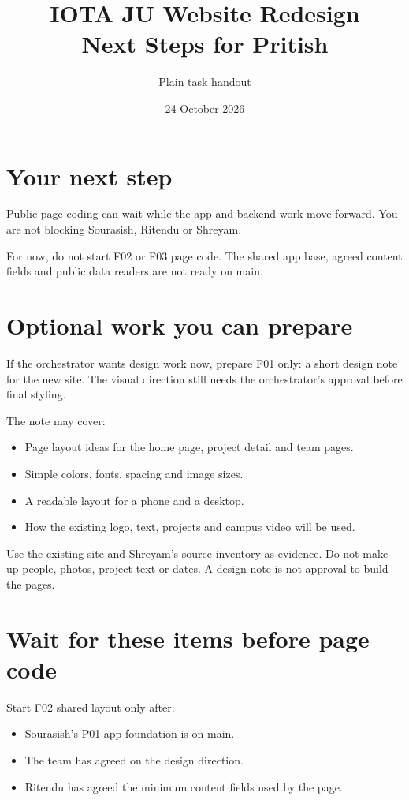 \documentclass[11pt]{article}
\begin{document}
\title{IOTA JU Website Redesign\\Next Steps for Pritish}
\author{Plain task handout}
\date{24 October 2026}
\maketitle

\section{Your next step}

Public page coding can wait while the app and backend work move forward. You are not blocking Sourasish, Ritendu or Shreyam.

For now, do not start F02 or F03 page code. The shared app base, agreed content fields and public data readers are not ready on main.

\section{Optional work you can prepare}

If the orchestrator wants design work now, prepare F01 only: a short design note for the new site. The visual direction still needs the orchestrator's approval before final styling.

The note may cover:

\begin{itemize}
\item Page layout ideas for the home page, project detail and team pages.
\item Simple colors, fonts, spacing and image sizes.
\item A readable layout for a phone and a desktop.
\item How the existing logo, text, projects and campus video will be used.
\end{itemize}

Use the existing site and Shreyam's source inventory as evidence. Do not make up people, photos, project text or dates. A design note is not approval to build the pages.

\section{Wait for these items before page code}

Start F02 shared layout only after:

\begin{itemize}
\item Sourasish's P01 app foundation is on main.
\item The team has agreed on the design direction.
\item Ritendu has agreed the minimum content fields used by the page.
\end{itemize}
\end{document}
